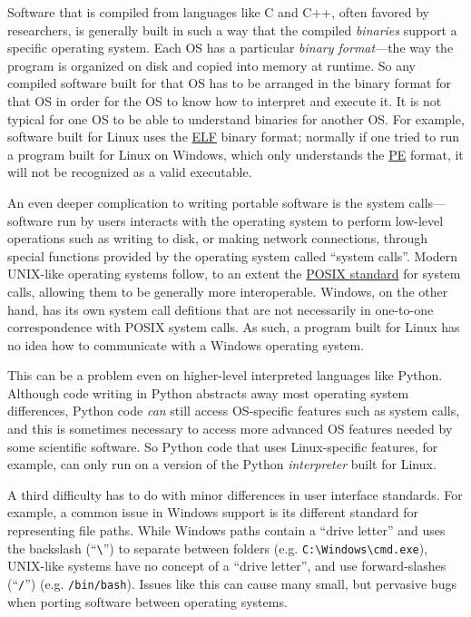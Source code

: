 \documentclass{deliverablereport}
\begin{document}
Software that is compiled from languages like C and C++, often favored
by researchers, is generally built in such a way that the compiled
\emph{binaries} support a specific operating system.  Each OS has a
particular \emph{binary format}---the way the program is organized on
disk and copied into memory at runtime.  So any compiled software
built for that OS has to be arranged in the binary format for that OS
in order for the OS to know how to interpret and execute it.  It is
not typical for one OS to be able to understand binaries for another
OS.  For example, software built for Linux uses the
\href{https://en.wikipedia.org/wiki/Executable_and_Linkable_Format}{ELF}
binary format; normally if one tried to run a program built for Linux
on Windows, which only understands the
\href{https://en.wikipedia.org/wiki/Portable_Executable}{PE} format,
it will not be recognized as a valid executable.

An even deeper complication to writing portable software is the system
calls--- software run by users interacts with the operating system to
perform low-level operations such as writing to disk, or making
network connections, through special functions provided by the
operating system called ``system calls''.  Modern UNIX-like operating
systems follow, to an extent the
\href{https://en.wikipedia.org/wiki/POSIX}{POSIX standard} for system
calls, allowing them to be generally more interoperable.  Windows, on
the other hand, has its own system call defitions that are not
necessarily in one-to-one correspondence with POSIX system calls.  As
such, a program built for Linux has no idea how to communicate with a
Windows operating system.

This can be a problem even on higher-level interpreted languages like
Python.  Although code writing in Python abstracts away most operating
system differences, Python code \emph{can} still access OS-specific
features such as system calls, and this is sometimes necessary to
access more advanced OS features needed by some scientific software.
So Python code that uses Linux-specific features, for example, can
only run on a version of the Python \emph{interpreter} built for
Linux.

A third difficulty has to do with minor differences in user interface
standards.  For example, a common issue in Windows support is its
different standard for representing file paths.  While Windows paths
contain a ``drive letter'' and uses the backslash
(``\texttt{\textbackslash}'') to separate between folders (e.g.
\texttt{C:\textbackslash{}Windows\textbackslash{}cmd.exe}), UNIX-like
systems have no concept of a ``drive letter'', and use forward-slashes
(``\texttt{/}'') (e.g. \texttt{/bin/bash}).  Issues like this can cause
many small, but pervasive bugs when porting software between operating
systems.
\end{document}
